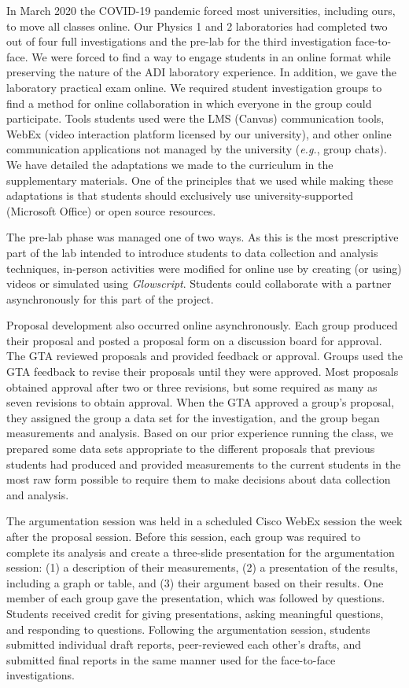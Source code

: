 \documentclass[aip, numerical, preprint]{revtex4-2}
\begin{document}
In March 2020 the COVID-19 pandemic forced most universities, including ours, to move all
classes online. Our Physics 1 and 2 laboratories had completed two out of
four full investigations and the pre-lab for the third investigation face-to-face. We were
forced to find a way to engage students in an online format while preserving the nature of the
ADI laboratory experience. In addition, we gave the laboratory practical exam online. We
required student investigation groups to find a method for online collaboration in which
everyone in the group could participate. Tools students used were the LMS (Canvas)
communication tools, WebEx (video interaction platform licensed by our university),
and other online communication applications not managed by the university (\emph{e.g.}, group
chats). We have detailed the adaptations we made to the curriculum in the supplementary
materials.  One of the principles that we used while making these adaptations is that students
should exclusively use university-supported (Microsoft Office) or open source resources.

The pre-lab phase was managed one of two ways.  As this is the most prescriptive part of the lab intended to introduce students to data collection and analysis techniques, in-person
activities were modified for online use by creating (or using) videos or simulated using
\emph{Glowscript}.\citep{glowscript} Students could collaborate with a partner asynchronously
for this part of the project.

Proposal development also occurred online asynchronously.  Each group produced their proposal
and posted a proposal form on a discussion board for approval. The GTA reviewed proposals and
provided feedback or approval. Groups used the GTA feedback to revise their proposals until
they were approved. Most proposals obtained approval after two or three revisions, but some
required as many as seven revisions to obtain approval. When the GTA approved a group's
proposal, they assigned the group a data set for the investigation, and the group began
measurements and analysis. Based on our prior experience running the class, we prepared some
data sets appropriate to the different proposals that previous students had produced and
provided measurements to the current students in the most raw form possible to require them to
make decisions about data collection and analysis.

The argumentation session was held in a scheduled Cisco WebEx session
the week after the proposal session. Before this session, each group was required to complete
its analysis and create a three-slide presentation for the argumentation session: (1) a description of their measurements, (2) a presentation of the
results, including a graph or table, and (3) their argument based on their
results.  One member of each group gave the presentation, which was followed by
questions. Students received credit for giving presentations, asking meaningful questions, and
responding to questions.  Following the argumentation session, students submitted individual
draft reports, peer-reviewed each other's drafts, and submitted final reports in the same
manner used for the face-to-face investigations.
\end{document}
